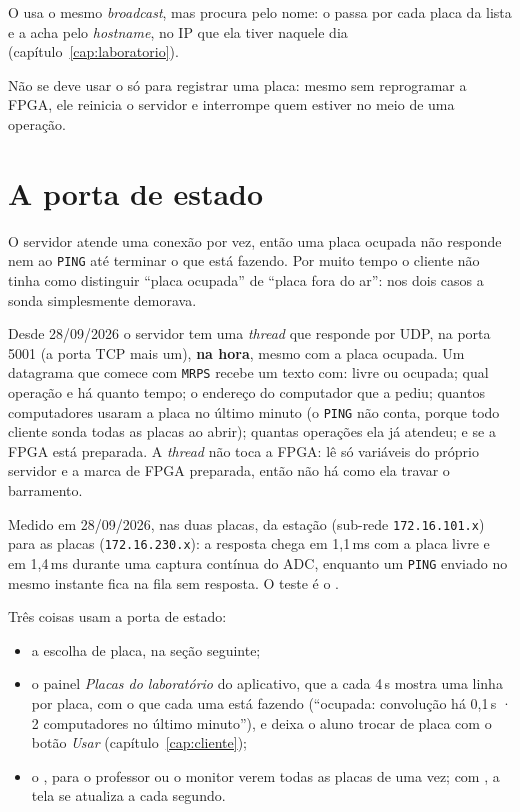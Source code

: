 O  usa o mesmo \emph{broadcast}, mas procura pelo nome: o
 passa por cada placa da lista e a acha pelo \emph{hostname}, no IP
que ela tiver naquele dia (capítulo~\ref{cap:laboratorio}).

Não se deve usar o  só para registrar uma placa: mesmo sem
reprogramar a FPGA, ele reinicia o servidor e interrompe quem estiver no meio de
uma operação.

\section{A porta de estado}
\label{sec:porta-estado}

O servidor atende uma conexão por vez, então uma placa ocupada não responde nem
ao \texttt{PING} até terminar o que está fazendo. Por muito tempo o cliente não
tinha como distinguir ``placa ocupada'' de ``placa fora do ar'': nos dois casos a
sonda simplesmente demorava.

Desde 28/09/2026 o servidor tem uma \emph{thread} que responde por UDP, na
porta 5001 (a porta TCP mais um), \textbf{na hora}, mesmo com a placa ocupada.
Um datagrama que comece com \texttt{MRPS} recebe um texto com: livre ou ocupada;
qual operação e há quanto tempo; o endereço do computador que a pediu; quantos
computadores usaram a placa no último minuto (o \texttt{PING} não conta, porque
todo cliente sonda todas as placas ao abrir); quantas operações ela já atendeu;
e se a FPGA está preparada. A \emph{thread} não toca a FPGA: lê só variáveis do
próprio servidor e a marca de FPGA preparada, então não há como ela travar o
barramento.

Medido em 28/09/2026, nas duas placas, da estação (sub-rede
\texttt{172.16.101.x}) para as placas (\texttt{172.16.230.x}): a resposta chega
em 1,1\,ms com a placa livre e em 1,4\,ms durante uma captura contínua do ADC,
enquanto um \texttt{PING} enviado no mesmo instante fica na fila sem resposta. O
teste é o .

Três coisas usam a porta de estado:

\begin{itemize}
  \item a escolha de placa, na seção seguinte;
  \item o painel \emph{Placas do laboratório} do aplicativo, que a cada 4\,s
    mostra uma linha por placa, com o que cada uma está fazendo (``ocupada:
    convolução há 0,1\,s · 2 computadores no último minuto''), e deixa o aluno
    trocar de placa com o botão \emph{Usar} (capítulo~\ref{cap:cliente});
  \item o , para o professor ou o
    monitor verem todas as placas de uma vez; com , a tela se
    atualiza a cada segundo.
\end{itemize}

